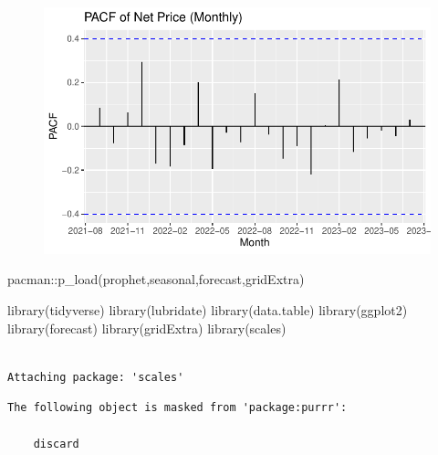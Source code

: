\documentclass[
  letterpaper,
  DIV=11,
  numbers=noendperiod]{scrartcl}
\newenvironment{Shaded}{\begin{snugshade}}{\end{snugshade}}
\newcommand{\FunctionTok}[1]{\textcolor[rgb]{0.28,0.35,0.67}{#1}}
\newcommand{\NormalTok}[1]{\textcolor[rgb]{0.00,0.23,0.31}{#1}}
\newcommand{\SpecialCharTok}[1]{\textcolor[rgb]{0.37,0.37,0.37}{#1}}
\begin{document}
\begin{figure}[H]

{\centering \includegraphics{Time-Serise-EDA_files/figure-pdf/unnamed-chunk-3-2.pdf}

}

\end{figure}

\begin{Shaded}
\begin{Highlighting}[]
\NormalTok{pacman}\SpecialCharTok{::}\FunctionTok{p\_load}\NormalTok{(prophet,seasonal,forecast,gridExtra)}
\end{Highlighting}
\end{Shaded}

\begin{Shaded}
\begin{Highlighting}[]
\FunctionTok{library}\NormalTok{(tidyverse)}
\FunctionTok{library}\NormalTok{(lubridate)}
\FunctionTok{library}\NormalTok{(data.table)}
\FunctionTok{library}\NormalTok{(ggplot2)}
\FunctionTok{library}\NormalTok{(forecast)}
\FunctionTok{library}\NormalTok{(gridExtra)}
\FunctionTok{library}\NormalTok{(scales)}
\end{Highlighting}
\end{Shaded}

\begin{verbatim}

Attaching package: 'scales'
\end{verbatim}

\begin{verbatim}
The following object is masked from 'package:purrr':

    discard
\end{verbatim}
\end{document}
